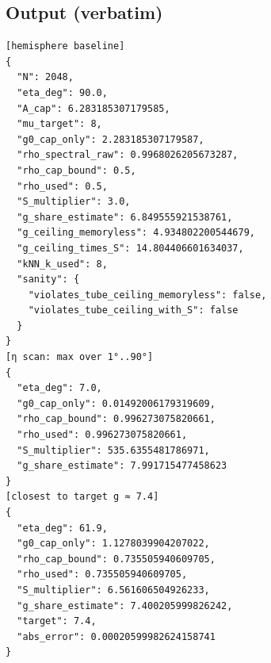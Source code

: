 \documentclass[11pt]{article}
\begin{document}
\subsection*{Output (verbatim)}
\begin{verbatim}
[hemisphere baseline]
{
  "N": 2048,
  "eta_deg": 90.0,
  "A_cap": 6.283185307179585,
  "mu_target": 8,
  "g0_cap_only": 2.283185307179587,
  "rho_spectral_raw": 0.9968026205673287,
  "rho_cap_bound": 0.5,
  "rho_used": 0.5,
  "S_multiplier": 3.0,
  "g_share_estimate": 6.849555921538761,
  "g_ceiling_memoryless": 4.934802200544679,
  "g_ceiling_times_S": 14.804406601634037,
  "kNN_k_used": 8,
  "sanity": {
    "violates_tube_ceiling_memoryless": false,
    "violates_tube_ceiling_with_S": false
  }
}
[η scan: max over 1°..90°]
{
  "eta_deg": 7.0,
  "g0_cap_only": 0.01492006179319609,
  "rho_cap_bound": 0.996273075820661,
  "rho_used": 0.996273075820661,
  "S_multiplier": 535.6355481786971,
  "g_share_estimate": 7.991715477458623
}
[closest to target g ≈ 7.4]
{
  "eta_deg": 61.9,
  "g0_cap_only": 1.1278039904207022,
  "rho_cap_bound": 0.735505940609705,
  "rho_used": 0.735505940609705,
  "S_multiplier": 6.561606504926233,
  "g_share_estimate": 7.400205999826242,
  "target": 7.4,
  "abs_error": 0.00020599982624158741
}
\end{verbatim}
\end{document}
